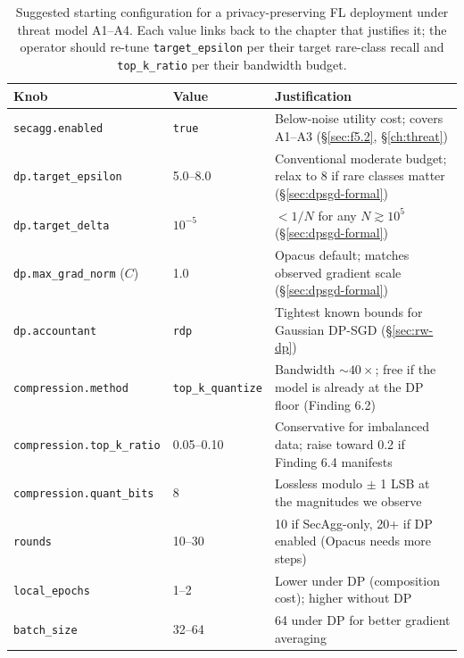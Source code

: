 \documentclass[11pt,a4paper]{report}
\begin{document}
\begin{table}[h]
  \centering
  \caption{Suggested starting configuration for a privacy-preserving
  FL deployment under threat model A1--A4. Each value links back to
  the chapter that justifies it; the operator should re-tune
  \texttt{target\_epsilon} per their target rare-class recall and
  \texttt{top\_k\_ratio} per their bandwidth budget.}
  \label{tab:deployment-config}
  \begin{tabular}{llp{6.5cm}}
    \toprule
    Knob & Value & Justification \\
    \midrule
    \texttt{secagg.enabled}            & \texttt{true}    & Below-noise utility cost; covers A1--A3 (\S\ref{sec:f5.2}, \S\ref{ch:threat}) \\
    \texttt{dp.target\_epsilon}        & 5.0--8.0         & Conventional moderate budget; relax to 8 if rare classes matter (\S\ref{sec:dpsgd-formal}) \\
    \texttt{dp.target\_delta}          & $10^{-5}$        & $< 1/N$ for any $N \gtrsim 10^5$ (\S\ref{sec:dpsgd-formal}) \\
    \texttt{dp.max\_grad\_norm} ($C$)  & 1.0              & Opacus default; matches observed gradient scale (\S\ref{sec:dpsgd-formal}) \\
    \texttt{dp.accountant}             & \texttt{rdp}     & Tightest known bounds for Gaussian DP-SGD (\S\ref{sec:rw-dp}) \\
    \texttt{compression.method}        & \texttt{top\_k\_quantize} & Bandwidth $\sim$$40\times$; free if the model is already at the DP floor (Finding 6.2) \\
    \texttt{compression.top\_k\_ratio} & 0.05--0.10       & Conservative for imbalanced data; raise toward 0.2 if Finding 6.4 manifests \\
    \texttt{compression.quant\_bits}   & 8                & Lossless modulo $\pm$ 1 LSB at the magnitudes we observe \\
    \texttt{rounds}                    & 10--30           & 10 if SecAgg-only, 20+ if DP enabled (Opacus needs more steps) \\
    \texttt{local\_epochs}             & 1--2             & Lower under DP (composition cost); higher without DP \\
    \texttt{batch\_size}               & 32--64           & 64 under DP for better gradient averaging \\
    \bottomrule
  \end{tabular}
\end{table}
\end{document}
